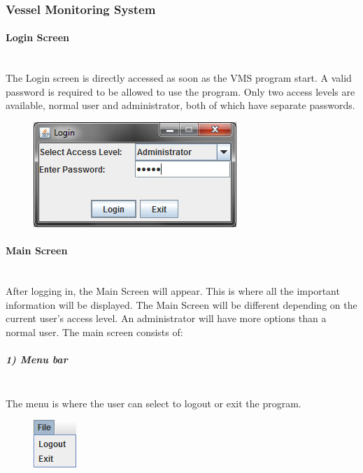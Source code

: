 \documentclass{article}
\begin{document}
\subsubsection{Vessel Monitoring System}
\paragraph{Login Screen \\ \\}
The Login screen is directly accessed as soon as the VMS program start. A valid password is required to be allowed to use the program. Only two access levels are available, normal user and administrator, both of which have separate passwords.%

	\begin{figure}[!htb]
	\centering
	\includegraphics[scale=0.80]{images/userManual1.jpg}
	\end{figure}

\paragraph{Main Screen \\ \\}
After logging in, the Main Screen will appear. This is where all the important information will be displayed. The Main Screen will be different depending on the current user's access level. An administrator will have more options than a normal user. The main screen consists of:

\subparagraph{1) Menu bar \\ \\}

The menu is where the user can select to logout or exit the program.
	\begin{figure}[!htb]
	\centering
	\includegraphics[scale=1]{images/userManual4.jpg}
	\end{figure}
\end{document}
